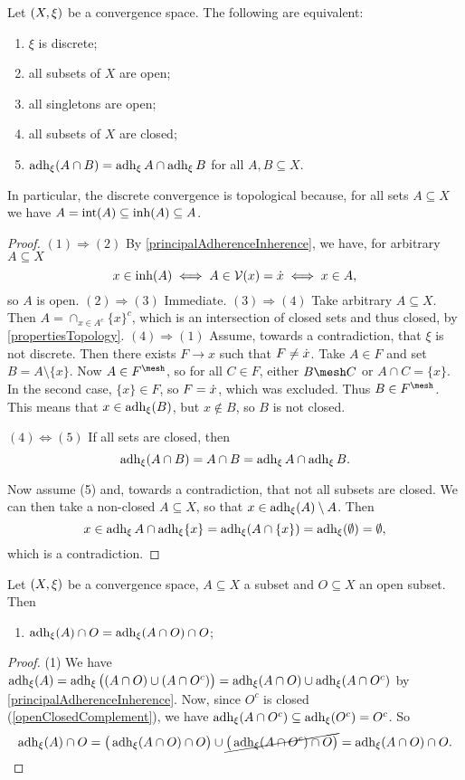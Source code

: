 \begin{proposition} \label{discreteTopologyCharacterisation}
Let $\sSet{X,\xi}$ be a convergence space. The following are equivalent:
\begin{enumerate}
\item $\xi$ is discrete;
\item all subsets of $X$ are open;
\item all singletons are open;
\item all subsets of $X$ are closed;
\item $\operatorname{adh}_\xi(A\cap B) = \operatorname{adh}_\xi A \cap \operatorname{adh}_\xi B$ for all $A,B\subseteq X$.
\end{enumerate}
\end{proposition}
In particular, the discrete convergence is topological because, for all sets $A\subseteq X$ we have $A = \operatorname{int}(A) \subseteq \operatorname{inh}(A) \subseteq A$.
\begin{proof}
$(1) \Rightarrow (2)$ By \ref{principalAdherenceInherence}, we have, for arbitrary $A\subseteq X$
\[ x\in \operatorname{inh}(A) \iff A\in \operatorname{\mathcal{V}}(x) = \dot{x} \iff x\in A, \]
so $A$ is open.
$(2) \Rightarrow (3)$ Immediate.
$(3) \Rightarrow (4)$ Take arbitrary $A\subseteq X$. Then $A = \cap_{x\in A^c}\{x\}^c$, which is an intersection of closed sets and thus closed, by \ref{propertiesTopology}.
$(4) \Rightarrow (1)$ Assume, towards a contradiction, that $\xi$ is not discrete. Then there exists $F\to x$ such that $F \neq \dot{x}$. Take $A\in F$ and set $B = A\setminus\{x\}$. Now $A\in F^\mesh$, so for all $C\in F$, either $B\mesh C$ or $A\cap C = \{x\}$. In the second case, $\{x\}\in F$, so $F = \dot{x}$, which was excluded. Thus $B\in F^\mesh$. This means that $x\in \operatorname{adh}_\xi(B)$, but $x\notin B$, so $B$ is not closed. 

$(4) \Leftrightarrow (5)$ If all sets are closed, then
\[ \operatorname{adh}_\xi(A\cap B) = A\cap B = \operatorname{adh}_\xi A \cap \operatorname{adh}_\xi B. \]

Now assume (5) and, towards a contradiction, that not all subsets are closed. We can then take a non-closed $A\subseteq X$, so that $x\in \operatorname{adh}_\xi(A)\setminus A$. Then
\[ x\in \operatorname{adh}_\xi A \cap \operatorname{adh}_\xi \{x\} = \operatorname{adh}_\xi(A\cap\{x\}) = \operatorname{adh}_\xi(\emptyset) = \emptyset, \]
which is a contradiction.
\end{proof}

\begin{lemma} \label{openClosedSetLemma}
Let $\sSet{X,\xi}$ be a convergence space, $A\subseteq X$ a subset and $O\subseteq X$ an open subset. Then
\begin{enumerate}
\item $\operatorname{adh}_\xi(A)\cap O = \operatorname{adh}_\xi(A\cap O)\cap O$;
\end{enumerate}
\end{lemma}
\begin{proof}
(1) We have $\operatorname{adh}_\xi(A) = \operatorname{adh}_\xi\big((A\cap O) \cup (A\cap O^c)\big) = \operatorname{adh}_\xi(A\cap O) \cup \operatorname{adh}_\xi(A\cap O^c)$ by \ref{principalAdherenceInherence}. Now, since $O^c$ is closed (\ref{openClosedComplement}), we have $\operatorname{adh}_\xi(A\cap O^c) \subseteq \operatorname{adh}_\xi(O^c) = O^c$. So
\[ \operatorname{adh}_\xi(A)\cap O = \big(\operatorname{adh}_\xi(A\cap O)\cap O\big) \cup \cancel{\big(\operatorname{adh}_\xi(A\cap O^c)\cap O\big)} = \operatorname{adh}_\xi(A\cap O)\cap O. \]
\end{proof}


